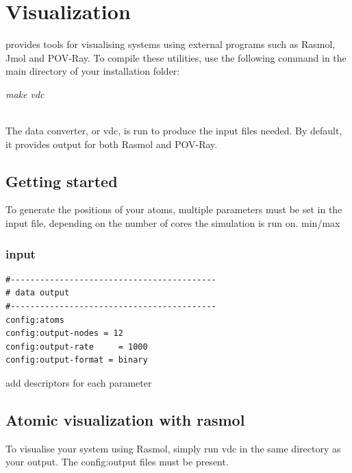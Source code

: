 \chapter{Visualization}\label{chap:visualization}

\vampire provides tools for visualising systems using external programs such as Rasmol, Jmol and POV-Ray. To compile these utilities, use the following command in the main directory of your \vampire installation folder:

\begin{minipage}[c]{\textwidth}
\centering
\textit{make vdc}
\end{minipage}\\

 The \vampire data converter, or vdc, is run to produce the input files needed. By default, it provides output for both Rasmol and POV-Ray.


\section*{Getting started}
To generate the positions of your atoms, multiple parameters must be set in the input file, depending on the number of cores the simulation is run on.
min/max\\

\subsection*{input}
{\footnotesize
\begin{verbatim}
#------------------------------------------
# data output
#------------------------------------------
config:atoms
config:output-nodes = 12
config:output-rate     = 1000
config:output-format = binary
\end{verbatim}
}

add descriptors for each parameter\\

\section*{Atomic visualization with rasmol}

To visualise your system using Rasmol, simply run vdc in the same directory as your output. The config:output files must be present.\\

